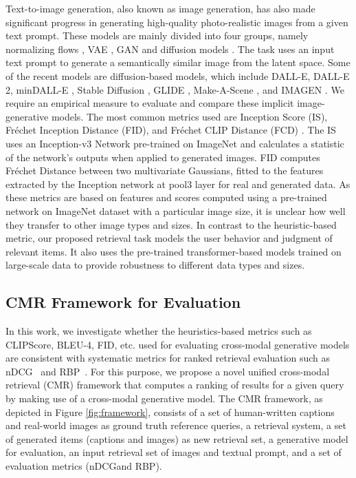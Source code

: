 \par Text-to-image generation, also known as image generation, has also made significant progress in generating high-quality photo-realistic images from a given text prompt. These models are mainly divided into four groups, namely normalizing flows \cite{JimenezRezende2015VariationalIW}, VAE \cite{Kingma2013AutoEncodingVB}, GAN \cite{Goodfellow2014GenerativeAN} and diffusion models \cite{stable-diffusion, IMAGEN, DALLE2}. The task uses an input text prompt to generate a semantically similar image from the latent space. Some of the recent models are diffusion-based models, which include DALL-E\cite{DALLE}, DALL-E 2\cite{DALLE2}, minDALL-E \cite{minDALL-E}, Stable Diffusion \cite{stable-diffusion}, GLIDE \cite{GLIDE}, Make-A-Scene \cite{MakeAScene}, and IMAGEN \cite{IMAGEN}. We require an empirical measure to evaluate and compare these implicit image-generative models. The most common metrics used are Inception Score (IS), Fréchet Inception Distance (FID), and Fréchet CLIP Distance (FCD) \cite{Betzalel2022ASO}. The IS uses an Inception-v3 Network pre-trained on ImageNet and calculates a statistic of the network’s outputs when applied to generated images. FID computes Fréchet Distance between two multivariate Gaussians, fitted to the features extracted by the Inception network at pool3 layer for real and generated data. As these metrics are based on features and scores computed using a pre-trained network on ImageNet \cite{ImageNet} dataset with a particular image size, it is unclear how well they transfer to other image types and sizes. In contrast to the heuristic-based metric, our proposed retrieval task models the user behavior and judgment of relevant items. It also uses the pre-trained transformer-based models trained on large-scale data to provide robustness to different data types and sizes.

\subsection{CMR Framework for Evaluation}
In this work, we investigate whether the heuristics-based metrics such as CLIPScore, BLEU-4, FID, etc. used for evaluating cross-modal generative models are consistent with systematic metrics for ranked retrieval evaluation such as nDCG\textquotesingle@K~\cite{Sakai2008OnIR} and RBP\textquotesingle@K~\cite{Moffat2008RankbiasedPF}. For this purpose, we propose a novel unified cross-modal retrieval (CMR) framework that computes a ranking of results for a given query by making use of a cross-modal generative model. The CMR framework, as depicted in Figure \ref{fig:framework}, consists of a set of human-written captions and real-world images as ground truth reference queries, a retrieval system, a set of generated items (captions and images) as new retrieval set, a generative model for evaluation, an input retrieval set of images and textual prompt, and a set of evaluation metrics (nDCG\textquotesingle@K and RBP\textquotesingle@K).



